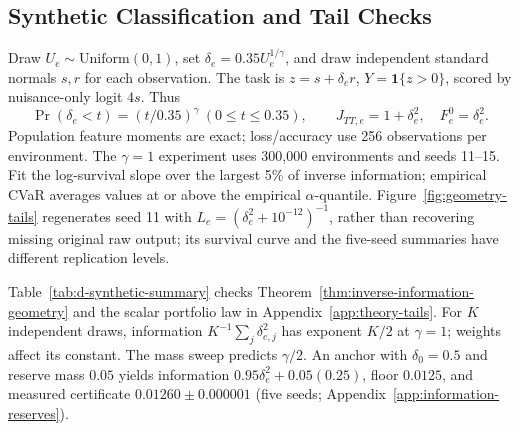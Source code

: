 \FloatBarrier
\subsection{Synthetic Classification and Tail Checks}
\label{app:synthetic-checks}

Draw $U_e\sim\mathrm{Uniform}(0,1)$, set $\delta_e=0.35U_e^{1/\gamma}$, and draw independent standard normals $s,r$ for each observation. The task is $z=s+\delta_er$, $Y=\mathbf1\{z>0\}$, scored by nuisance-only logit $4s$. Thus
\begin{equation}
\Pr(\delta_e<t)=(t/0.35)^\gamma\ (0\le t\le0.35),\qquad J_{TT,e}=1+\delta_e^2,\quad F_e^0=\delta_e^2.
\label{eq:d-synthetic-generator}
\end{equation}
Population feature moments are exact; loss/accuracy use 256 observations per environment. The $\gamma=1$ experiment uses 300,000 environments and seeds 11--15. Fit the log-survival slope over the largest 5\% of inverse information; empirical CVaR averages values at or above the empirical $\alpha$-quantile. Figure~\ref{fig:geometry-tails} regenerates seed 11 with $L_e=(\delta_e^2+10^{-12})^{-1}$, rather than recovering missing original raw output; its survival curve and the five-seed summaries have different replication levels.

Table~\ref{tab:d-synthetic-summary} checks Theorem~\ref{thm:inverse-information-geometry} and the scalar portfolio law in Appendix~\ref{app:theory-tails}. For $K$ independent draws, information $K^{-1}\sum_j\delta_{e,j}^2$ has exponent $K/2$ at $\gamma=1$; weights affect its constant. The mass sweep predicts $\gamma/2$. An anchor with $\delta_0=0.5$ and reserve mass $0.05$ yields information $0.95\delta_e^2+0.05(0.25)$, floor $0.0125$, and measured certificate $0.01260\pm0.000001$ (five seeds; Appendix~\ref{app:information-reserves}).

